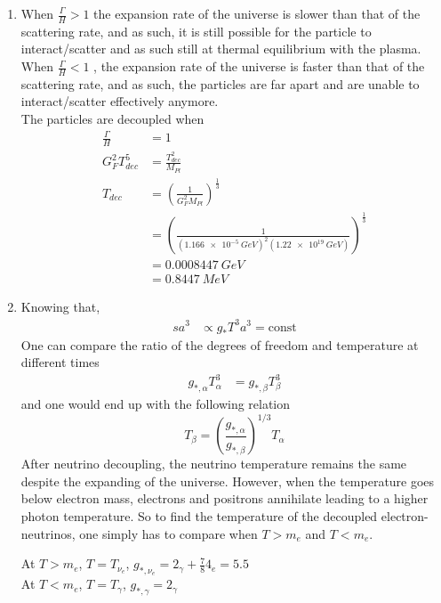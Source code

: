 \begin{enumerate}[label=\alph*)]
\item When $\frac{\Gamma}{H} > 1$ the expansion rate of the universe is slower than that of the scattering rate, and as such, it is still possible for the particle to interact/scatter and as such still at thermal equilibrium with the plasma. \\

When $\frac{\Gamma}{H} < 1$ , the expansion rate of the universe is faster than that of the scattering rate, and as such, the particles are far apart and are unable to interact/scatter effectively anymore. \\

The particles are decoupled when 
\begin{align*}
\frac{\Gamma}{H} &= 1 \\
G_F^2 T_{dec}^5 &= \frac{T_{dec}^2}{M_{Pl}}\\
T_{dec} &= \left( \frac{1}{G_F^2 M_{Pl}}\right)^{\frac{1}{3}}\\
&= \left( \frac{1}{(\SI{1.166e-5}{GeV})^2 (\SI{1.22e19}{GeV})}\right)^{\frac{1}{3}}\\
&= \SI{0.0008447}{GeV} \\ &= \SI{0.8447}{MeV} 
\end{align*}

\item Knowing that,\\
\begin{align}
sa^3 &\propto g_\ast T^3 a^3 = \text{const}
\end{align}
One can compare the ratio of the degrees of freedom and temperature at different times
\begin{align}
g_{\ast,\alpha}T_\alpha^3 &= g_{\ast,\beta}T_\beta^3 
\end{align}
and one would end up with the following relation
\begin{equation}
T_\beta = \left(\frac{g_{\ast,\alpha}}{g_{\ast,\beta}}\right)^{1/3}T_\alpha
\end{equation}
After neutrino decoupling, the neutrino temperature remains the same despite the expanding of the universe. However, when the temperature goes below electron mass, electrons and positrons annihilate leading to a higher photon temperature. 
So to find the temperature of the decoupled electron-neutrinos, one simply has to compare when $T > m_e$ and $T < m_e$.

At $T > m_e$, $T = T_{\nu_e}$, $g_{\ast,\nu_e} = 2_\gamma + \frac{7}{8}4_e = 5.5 $\\
At $T < m_e$, $T= T_{\gamma}$, $g_{\ast,\gamma} = 2_\gamma $


\end{enumerate}
